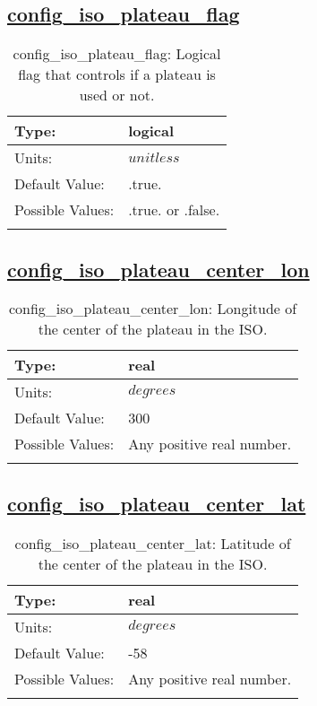 \subsection[config\_iso\_plateau\_flag]{\hyperref[sec:nm_tab_iso]{config\_iso\_plateau\_flag}}
\label{subsec:nm_sec_config_iso_plateau_flag}
\begin{center}
\begin{longtable}{| p{2.0in} || p{4.0in} |}
    \hline
    Type: & logical \\
    \hline
    Units: & $unitless$ \\
    \hline
    Default Value: & .true. \\
    \hline
    Possible Values: & .true. or .false. \\
    \hline
    \caption{config\_iso\_plateau\_flag: Logical flag that controls if a plateau is used or not.}
\end{longtable}
\end{center}
\subsection[config\_iso\_plateau\_center\_lon]{\hyperref[sec:nm_tab_iso]{config\_iso\_plateau\_center\_lon}}
\label{subsec:nm_sec_config_iso_plateau_center_lon}
\begin{center}
\begin{longtable}{| p{2.0in} || p{4.0in} |}
    \hline
    Type: & real \\
    \hline
    Units: & $degrees$ \\
    \hline
    Default Value: & 300 \\
    \hline
    Possible Values: & Any positive real number. \\
    \hline
    \caption{config\_iso\_plateau\_center\_lon: Longitude of the center of the plateau in the ISO.}
\end{longtable}
\end{center}
\subsection[config\_iso\_plateau\_center\_lat]{\hyperref[sec:nm_tab_iso]{config\_iso\_plateau\_center\_lat}}
\label{subsec:nm_sec_config_iso_plateau_center_lat}
\begin{center}
\begin{longtable}{| p{2.0in} || p{4.0in} |}
    \hline
    Type: & real \\
    \hline
    Units: & $degrees$ \\
    \hline
    Default Value: & -58 \\
    \hline
    Possible Values: & Any positive real number. \\
    \hline
    \caption{config\_iso\_plateau\_center\_lat: Latitude of the center of the plateau in the ISO.}
\end{longtable}
\end{center}
